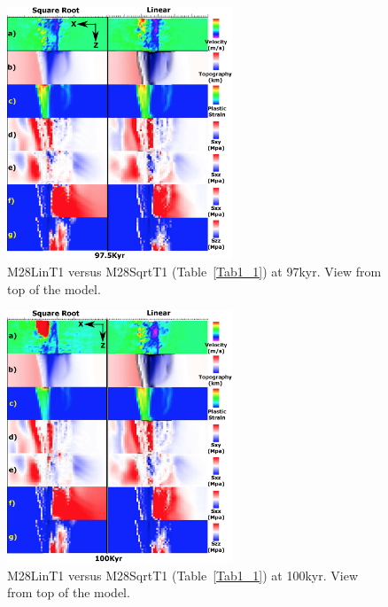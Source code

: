 \begin{figure}[h]
  \centering
    \includegraphics[width=0.6\textwidth]{./Figures/fig_Results4_3_sqrt_vs_lin_cut_back_97kyr.eps}
  \caption{M28LinT1 versus M28SqrtT1 (Table~\hyperref[Tab1_1]{\ref{Tab1_1}}) at 97kyr. View from top of the model.}
 \label{fig_Results4_3_1}
\end{figure}  

\begin{figure}[h]
  \centering
    \includegraphics[width=0.6\textwidth]{./Figures/fig_Results4_3_sqrt_vs_lin_cut_back_100kyr.eps}
  \caption{M28LinT1 versus M28SqrtT1 (Table~\hyperref[Tab1_1]{\ref{Tab1_1}}) at 100kyr. View from top of the model.}
 \label{fig_Results4_3_2}
\end{figure} 

